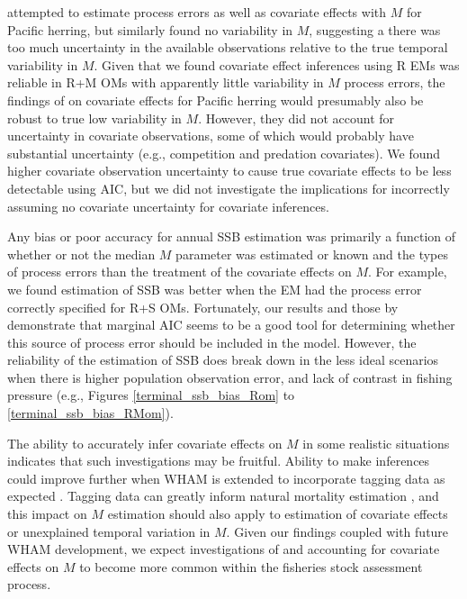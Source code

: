 \documentclass[
  12pt,
]{article}
\begin{document}
\citet{derisoetal08} attempted to estimate process errors as well as covariate effects with \(M\) for Pacific herring, but similarly found no variability in \(M\), suggesting a there was too much uncertainty in the available observations relative to the true temporal variability in \(M\). Given that we found covariate effect inferences using R EMs was reliable in R+M OMs with apparently little variability in \(M\) process errors, the findings of \citet{derisoetal08} on covariate effects for Pacific herring would presumably also be robust to true low variability in \(M\). However, they did not account for uncertainty in covariate observations, some of which would probably have substantial uncertainty (e.g., competition and predation covariates). We found higher covariate observation uncertainty to cause true covariate effects to be less detectable using AIC, but we did not investigate the implications for incorrectly assuming no covariate uncertainty for covariate inferences.

Any bias or poor accuracy for annual SSB estimation was primarily a function of whether or not the median \(M\) parameter was estimated or known and the types of process errors than the treatment of the covariate effects on \(M\). For example, we found estimation of SSB was better when the EM had the process error correctly specified for R+S OMs. Fortunately, our results and those by \citet{milleretal_inreview1} demonstrate that marginal AIC seems to be a good tool for determining whether this source of process error should be included in the model. However, the reliability of the estimation of SSB does break down in the less ideal scenarios when there is higher population observation error, and lack of contrast in fishing pressure (e.g., Figures \ref{terminal_ssb_bias_Rom} to \ref{terminal_ssb_bias_RMom}).

The ability to accurately infer covariate effects on \(M\) in some realistic situations indicates that such investigations may be fruitful. Ability to make inferences could improve further when WHAM is extended to incorporate tagging data as expected \citep{milleretal_inreview}. Tagging data can greatly inform natural mortality estimation \citep{pollocketal91, hampton00}, and this impact on \(M\) estimation should also apply to estimation of covariate effects or unexplained temporal variation in \(M\). Given our findings coupled with future WHAM development, we expect investigations of and accounting for covariate effects on \(M\) to become more common within the fisheries stock assessment process.
\end{document}
